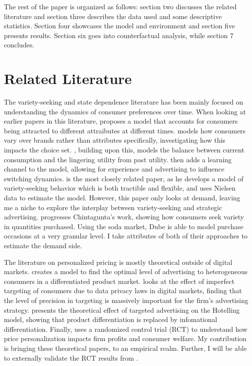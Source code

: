 \documentclass[11pt]{article}
\theoremstyle{definition}
\theoremstyle{remark}
\begin{document}
The rest of the paper is organized as follows: section two discusses the related
literature and section three describes the data used and some descriptive
statistics. Section four showcases the model and environment and section five
presents results. Section six goes into counterfactual analysis, while section 7
concludes.

\section{Related Literature}


The variety-seeking and state dependence literature has been mainly focused on understanding the dynamics of consumer preferences over time. When looking at earlier papers in this literature, \citet{mcalister_dynamic_2026} proposes a model that accounts for consumers being attracted to different attraibutes at different times. \cite{givon_variety_1984} models how consumers vary over brands rather than attributes specifically, investigating how this impacts the choice set. \cite{lattin_model_1987}, building upon this, models the balance between current consumption and the lingering utility from past utility. \cite{erdem_decision-making_1996} then adds a learning channel to the model, allowing for experience and advertising to influence switching dynamics. \cite{chintagunta_variety_1999} is the most closely related paper, as he develops a model of variety-seeking behavior which is both tractible and flexible, and uses Nielsen data to estimate the model. However, this paper only looks at demand, leaving me a niche to explore the interplay between variety-seeking and strategic advertising. \cite{dube_multiple_2004} progresses Chintagunta's work, showing how consumers seek variety in quantities purchased. Using the soda market, Dube is able to model purchase occasions at a very granular level. I take attributes of both of their approaches to estimate the demand side.


The literature on personalized pricing is mostly theoretical outside of digital markets. \citet{grossman_informative_1984} creates a model to find the optimal level of advertising to heterogeneous consumers in a differentiated product market. \cite{karle_imperfect_nodate} looks at the effect of imperfect targeting of consumers due to data privacy laws in digital markets, finding that the level of precision in targeting is massively important for the firm's advertising strategy. \cite{moorthy_targeting_2023} presents the theoretical effect of targeted advertising on the Hotelling model, showing that product differentiation is replaced by infomational differentiation. Finally, \cite{dube_personalized_2023} uses a randomized control trial (RCT) to understand how price personalization impacts firm profits and consumer welfare. My contribution is bringing these theoretical papers, to an empirical realm. Further, I will be able to externally validate the RCT results from \cite{dube_personalized_2023}.
\end{document}
